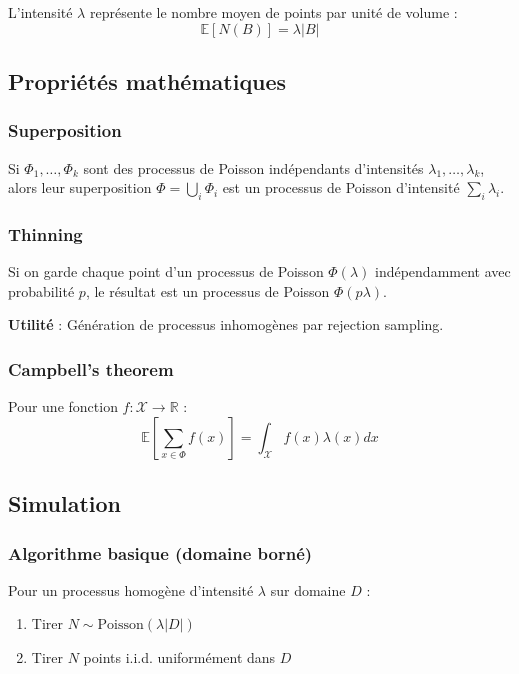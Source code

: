 L'intensité $\lambda$ représente le nombre moyen de points par unité de volume :
\[
\mathbb{E}[N(B)] = \lambda |B|
\]

\subsection{Propriétés mathématiques}

\subsubsection{Superposition}

Si $\Phi_1, \ldots, \Phi_k$ sont des processus de Poisson indépendants d'intensités $\lambda_1, \ldots, \lambda_k$, alors leur superposition $\Phi = \bigcup_i \Phi_i$ est un processus de Poisson d'intensité $\sum_i \lambda_i$.

\subsubsection{Thinning}

Si on garde chaque point d'un processus de Poisson $\Phi(\lambda)$ indépendamment avec probabilité $p$, le résultat est un processus de Poisson $\Phi(p\lambda)$.

\textbf{Utilité} : Génération de processus inhomogènes par rejection sampling.

\subsubsection{Campbell's theorem}

Pour une fonction $f : \mathcal{X} \rightarrow \mathbb{R}$ :
\[
\mathbb{E}\left[\sum_{x \in \Phi} f(x)\right] = \int_\mathcal{X} f(x) \lambda(x) dx
\]

\subsection{Simulation}

\subsubsection{Algorithme basique (domaine borné)}

Pour un processus homogène d'intensité $\lambda$ sur domaine $D$ :
\begin{enumerate}
    \item Tirer $N \sim \text{Poisson}(\lambda |D|)$
    \item Tirer $N$ points i.i.d. uniformément dans $D$
\end{enumerate}

